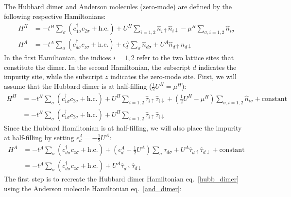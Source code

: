 \documentclass[10pt]{report}
\numberwithin{equation}{section}
\begin{document}
The Hubbard dimer and Anderson molecules (zero-mode) are defined by the following respective Hamiltonians:
\begin{equation}\begin{aligned}
	H^H &= -t^H\sum_{\sigma}\left(c^\dagger_{1\sigma}c_{2\sigma} + \text{h.c.}\right) + U^H\sum_{i=1,2}\hat n_{i \uparrow}\hat n_{i \downarrow} - \mu^H \sum_{\sigma, i=1,2}\hat n_{i\sigma}\\
	H^A &= -t^A\sum_{\sigma}\left(c^\dagger_{d\sigma}c_{z\sigma} + \text{h.c.}\right) + \epsilon_d^A \sum_{\sigma}\hat n_{d\sigma} + U^A\hat n_{d \uparrow}\hat n_{d \downarrow}
\end{aligned}\end{equation}
In the first Hamiltonian, the indices \(i=1,2\) refer to the two lattice sites that constitute the dimer. In the second Hamiltonian, the subscript \(d\) indicates the impurity site, while the subscript \(z\) indicates the zero-mode site. First, we will assume that the Hubbard dimer is at half-filling (\(\frac{1}{2}U^H = \mu^H\)):
\begin{equation}\begin{aligned}
	\label{hubb_dimer}
	H^H &= -t^H\sum_{\sigma}\left(c^\dagger_{1\sigma}c_{2\sigma} + \text{h.c.}\right) + U^H\sum_{i=1,2}\hat \tau_{i \uparrow}\hat \tau_{i \downarrow} + \left(\frac{1}{2}U^H- \mu^H\right) \sum_{\sigma, i=1,2}\hat n_{i\sigma} + \text{constant}\\
	    &= -t^H\sum_{\sigma}\left(c^\dagger_{1\sigma}c_{2\sigma} + \text{h.c.}\right) + U^H\sum_{i=1,2}\hat \tau_{i \uparrow}\hat \tau_{i \downarrow}
\end{aligned}\end{equation}
Since the Hubbard Hamiltonian is at half-filling, we will also place the impurity at half-filling by setting \(\epsilon_d^A = -\frac{1}{2}U^A\):
\begin{equation}\begin{aligned}
	\label{and_dimer}
	H^A &= -t^A\sum_{\sigma}\left(c^\dagger_{d\sigma}c_{z\sigma} + \text{h.c.}\right) + \left(\epsilon_d^A + \frac{1}{2}U^A\right) \sum_{\sigma}\hat \tau_{d\sigma} + U^A\hat \tau_{d \uparrow}\hat \tau_{d \downarrow} + \text{constant}\\
	    &= -t^A\sum_{\sigma}\left(c^\dagger_{d\sigma}c_{z\sigma} + \text{h.c.}\right) + U^A\hat \tau_{d \uparrow}\hat \tau_{d \downarrow}
\end{aligned}\end{equation}
The first step is to recreate the Hubbard dimer Hamiltonian eq.~\ref{hubb_dimer} using the Anderson molecule Hamiltonian eq.~\ref{and_dimer}:
\end{document}
